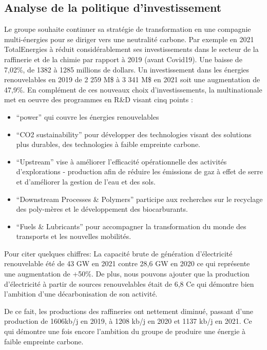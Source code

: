 \documentclass[12pt]{article}
\begin{document}
\subsection{Analyse de la politique d'investissement} 
Le groupe souhaite continuer sa stratégie de transformation en une compagnie multi-énergies pour se diriger 
vers une neutralité carbone. Par exemple en 2021 TotalEnergies à réduit considérablement ses investissements 
dans le secteur de la raffinerie et de la chimie par rapport à 2019 (avant Covid19). Une baisse 
de 7,02\%, de 1382 à 1285 millions de dollars.
Un investissement dans les énergies renouvelables en 2019 de 2 259 M\$ à 3 341 M\$ en 2021 soit une augmentation de 47,9\%.
En complément de ces nouveaux choix d'investissements, la multinationale met en oeuvre des programmes en R\&D visant cinq points : 
\begin{itemize}
    \item “power” qui couvre les énergies renouvelables 
    \item “CO2 sustainability” pour développer des technologies visant des solutions plus durables, des  
        technologies à faible empreinte carbone.
    \item “Upstream” vise à améliorer l'efficacité opérationnelle des activités d'explorations - production afin 
        de réduire les émissions de gaz à effet de serre et d'améliorer la gestion de l'eau et des sols.
    \item “Downstream Processes \& Polymers” participe aux recherches sur le recyclage des poly-mères et le   
        développement des biocarburants.
    \item “Fuels \& Lubricants” pour accompagner la transformation du monde des transports et les nouvelles 
        mobilités.
\end{itemize}
Pour citer quelques chiffres: 
La capacité brute de génération d'électricité renouvelable été de 43 GW en 2021 contre 28,6 GW en 2020 ce qui représente une augmentation de +50\%. De plus, nous pouvons ajouter que la production d'électricité à partir de sources renouvelables était de 6,8%
Ce qui démontre bien l'ambition d'une décarbonisation de son activité.

De ce fait, les productions des raffineries ont nettement diminué, passant d'une production de 1606kb/j en 2019, à 1208 kb/j en 2020 et 1137 kb/j en 2021. Ce qui démontre une fois encore l'ambition du groupe de produire une énergie à faible empreinte carbone.
\end{document}
